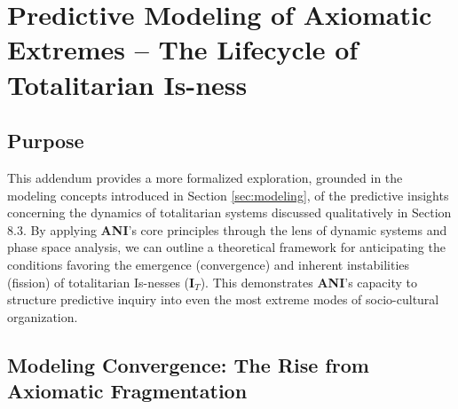 \documentclass{article}
\newcommand{\ANI}{\textbf{ANI}}             %
\newcommand{\Isness}{\mathbf{I}}            %
\begin{document}
\section{Predictive Modeling of Axiomatic Extremes – The Lifecycle of Totalitarian Is-ness}\label{sec:axiomatic-extremes}

\subsection{Purpose}

This addendum provides a more formalized exploration, grounded in the modeling concepts introduced in Section \ref{sec:modeling}, of the predictive insights concerning the dynamics of totalitarian systems discussed qualitatively in Section 8.3. By applying \ANI{}'s core principles through the lens of dynamic systems and phase space analysis, we can outline a theoretical framework for anticipating the conditions favoring the emergence (convergence) and inherent instabilities (fission) of totalitarian Is-nesses ($\Isness_T$). This demonstrates \ANI{}'s capacity to structure predictive inquiry into even the most extreme modes of socio-cultural organization.

\subsection{Modeling Convergence: The Rise from Axiomatic Fragmentation}
\end{document}
